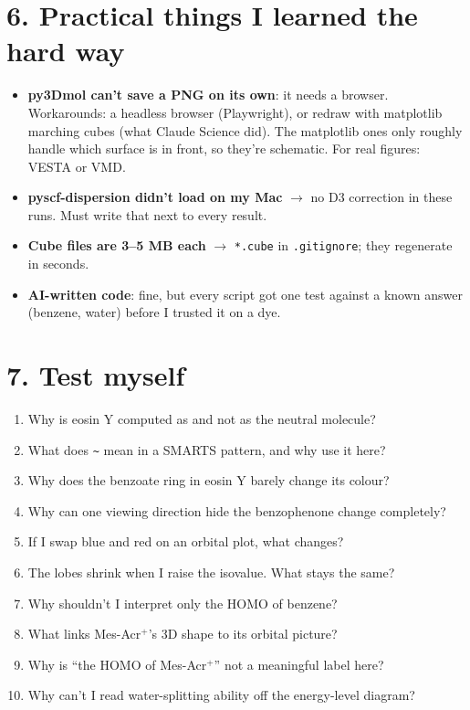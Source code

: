 \documentclass[11pt,a4paper]{article}
\begin{document}
\section*{6. Practical things I learned the hard way}

\begin{itemize}
  \item \textbf{py3Dmol can't save a PNG on its own}: it needs a browser. Workarounds: a headless
  browser (Playwright), or redraw with matplotlib marching cubes (what Claude Science did). The
  matplotlib ones only roughly handle which surface is in front, so they're schematic. For real
  figures: VESTA or VMD.
  \item \textbf{pyscf-dispersion didn't load on my Mac} $\to$ no D3 correction in these runs.
  Must write that next to every result.
  \item \textbf{Cube files are 3--5 MB each} $\to$ \texttt{*.cube} in \texttt{.gitignore}; they
  regenerate in seconds.
  \item \textbf{AI-written code}: fine, but every script got one test against a known answer
  (benzene, water) before I trusted it on a dye.
\end{itemize}

\section*{7. Test myself}

\begin{askme}
\begin{enumerate}[leftmargin=*]
  \item Why is eosin Y computed as  and not as the neutral molecule?
  \item What does \texttt{\textasciitilde} mean in a SMARTS pattern, and why use it here?
  \item Why does the benzoate ring in eosin Y barely change its colour?
  \item Why can one viewing direction hide the benzophenone change completely?
  \item If I swap blue and red on an orbital plot, what changes?
  \item The lobes shrink when I raise the isovalue. What stays the same?
  \item Why shouldn't I interpret only the HOMO of benzene?
  \item What links Mes-Acr$^+$'s 3D shape to its orbital picture?
  \item Why is ``the HOMO of Mes-Acr$^+$'' not a meaningful label here?
  \item Why can't I read water-splitting ability off the energy-level diagram?
\end{enumerate}
\end{askme}
\end{document}
